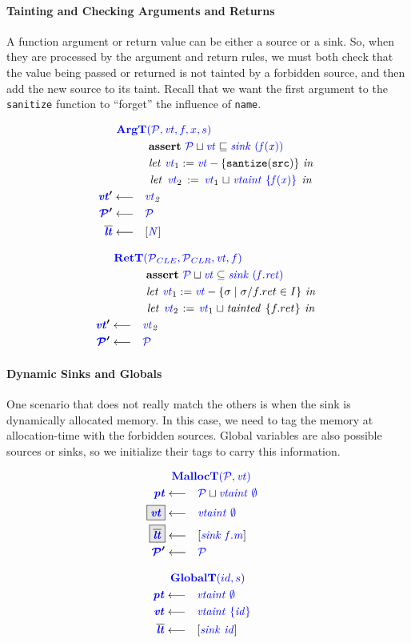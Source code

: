 \documentclass[acmsmall,review,anonymous]{acmart}\settopmatter{printfolios=true,printccs=false,printacmref=false}
\begin{document}
\paragraph{Tainting and Checking Arguments and Returns}

A function argument or return value can be either a source or a sink.
So, when they are processed by the argument and return rules,
we must both check that the value being passed or returned is not tainted by a forbidden
source, and then add the new source to its taint. Recall that we want the first argument to
the {\tt sanitize} function to ``forget'' the influence of {\tt name}.

\begin{minipage}[t]{.49\textwidth}
  \[\begin{aligned}
  \truledef{\argt}
  \assert{\PCT \sqcup \vt \sqsubseteq \sink{(f(x))}}
  \letin{\vt_1 := \vt - \{\mathtt{santize(src)}\}}
  \letin{\vt_2 := \vt_1 \sqcup \vtaint{\{f(x)\}}}
  \settag{\vt'}{\vt_2}
  \settag{\PCT'}{\PCT}
  \settag{\lts}{\left[\N\right]}
  \end{aligned}\]
\end{minipage}
\begin{minipage}[t]{.49\textwidth}            
  \[\begin{aligned}
  \truledef{\rett}
  \assert{\PCT \sqcup \vt \subseteq \sink{(f.ret)}}
  \letin{\vt_1 := \vt - \{\sigma \mid \sigma / f.ret \in I \}}
  \letin{\vt_2 := \vt_1 \sqcup \mathit{tainted} ~ \{f.ret\}}
  \settag{\vt'}{\vt_2}
  \settag{\PCT'}{\PCT}
  \end{aligned}\]
\end{minipage}

\paragraph{Dynamic Sinks and Globals}

One scenario that does not really match the others is when the sink is dynamically allocated
memory. In this case, we need to tag the memory at allocation-time with the forbidden
sources. Global variables are also possible sources or sinks, so we initialize their
tags to carry this information.

\begin{minipage}[t]{0.49\textwidth}
\[\begin{aligned}
\truledef{\malloct}
\settag{\pt}{\PCT \sqcup \vtaint{\emptyset}}
\settagopt{\vt}{\vtaint{\emptyset}}
\settagopt{\overline{\lt}}{\left[\sink{f.m}\right]}
\settag{\PCT'}{\PCT}
\end{aligned}\]
\end{minipage}
\begin{minipage}[t]{0.49\textwidth}
\[\begin{aligned}
\truledef{\globalt}
\settag{\pt}{\vtaint{\emptyset}}
\settag{\vt}{\vtaint{\{id\}}}
\settag{\overline{\lt}}{\left[\sink{id}\right]}
\end{aligned}\]
\end{minipage}
\end{document}
